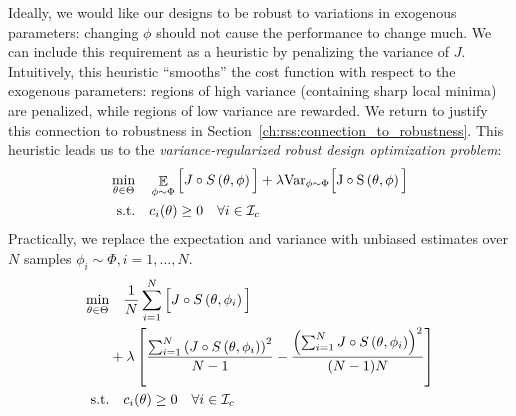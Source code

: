 Ideally, we would like our designs to be robust to variations in exogenous parameters: changing $\phi$ should not cause the performance to change much. We can include this requirement as a heuristic by penalizing the variance of $J$. Intuitively, this heuristic ``smooths'' the cost function with respect to the exogenous parameters: regions of high variance (containing sharp local minima) are penalized, while regions of low variance are rewarded. We return to justify this connection to robustness in Section~\ref{ch:rss:connection_to_robustness}. This heuristic leads us to the \textit{variance-regularized robust design optimization problem}:
\begin{subequations}\label{ch:rss:design_optimization_nlp_generic}
	\begin{align}
		\min_{\theta \in \Theta} & \quad \mathop{\mathbb{E}}_{\phi \sim \Phi} \Big[ J\circ S\left( \theta, \phi \right) \Big] + \lambda \rm{Var}_{\phi\sim\Phi}\Big[ J\circ S\left( \theta, \phi \right) \Big] \label{ch:rss:design_optimization_objective_generic} \\
		\text{s.t.}              & \quad c_i(\theta) \geq 0 \quad \forall i \in \mathcal{I}_c \label{ch:rss:design_optimization_constraints_generic}
	\end{align}
\end{subequations}
Practically, we replace the expectation and variance with unbiased estimates over $N$ samples $\phi_i \sim \Phi, i=1,\ldots,N$.
\begin{subequations}\label{ch:rss:design_optimization_nlp}
	\begin{align}
		\min_{\theta \in \Theta} & \quad \frac{1}{N}\sum_{i=1}^{N} \Big[J\circ S\left( \theta, \phi_i \right)\Big] \label{ch:rss:design_optimization_objective}                                              \\
		                         & + \lambda \left[ \frac{\sum_{i=1}^N \left( J\circ S\left( \theta, \phi_i \right) \right)^2}{N-1} - \frac{\left( \sum_{i=1}^N J\circ S\left( \theta, \phi_i \right) \right)^2}{(N-1)N} \right] \nonumber \\
		\text{s.t.}              & \quad c_i(\theta) \geq 0 \quad \forall i \in \mathcal{I}_c \label{ch:rss:design_optimization_constraints}
	\end{align}
\end{subequations}

